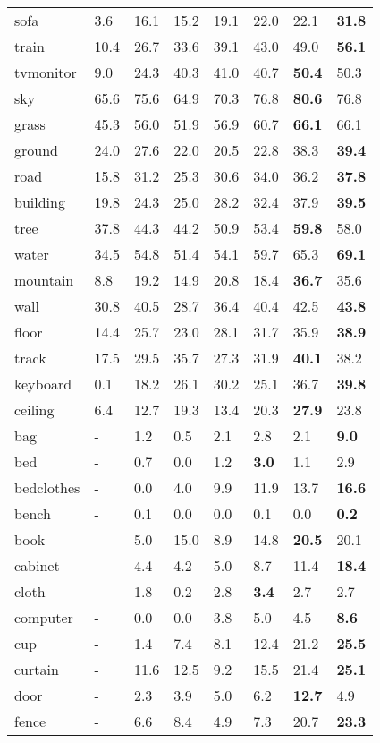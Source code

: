 \documentclass[10pt,twocolumn,letterpaper]{article}
\begin{document}
\begin{table}
\begin{center}
{\begin{tabular}{|x|xx|xxx|x|x|}
	sofa\dag&3.6&16.1&15.2&19.1&{22.0}&22.1&\textbf{31.8}\\
	train\dag&10.4&26.7&33.6&39.1&{43.0}&{49.0}&\textbf{56.1}\\
	tvmonitor\dag&9.0&24.3&40.3&{41.0}&40.7&{\textbf{50.4}}&50.3\\
	sky\dag&65.6&75.6&64.9&70.3&{76.8}&{\textbf{80.6}}&76.8\\
	grass\dag&45.3&56.0&51.9&56.9&{60.7}&{\textbf{66.1}}&66.1\\
	ground\dag&24.0&{27.6}&22.0&20.5&22.8&38.3&\textbf{39.4}\\
	road\dag&15.8&31.2&25.3&30.6&{34.0}&{36.2}&\textbf{37.8}\\
	building\dag&19.8&24.3&25.0&28.2&{32.4}&37.9&\textbf{39.5}\\
	tree\dag&37.8&44.3&44.2&50.9&{53.4}&{\textbf{59.8}}&58.0\\
	water\dag&34.5&54.8&51.4&54.1&{59.7}&65.3&\textbf{69.1}\\
	mountain\dag&8.8&19.2&14.9&{20.8}&18.4&{\textbf{36.7}}&35.6\\
	wall\dag&30.8&{40.5}&28.7&36.4&40.4&{42.5}&\textbf{43.8}\\
	floor\dag&14.4&25.7&23.0&28.1&{31.7}&{35.9}&\textbf{38.9}\\
	track\dag&17.5&29.5&{35.7}&27.3&31.9&{\textbf{40.1}}&38.2\\
	keyboard\dag&0.1&18.2&26.1&{30.2}&25.1&{36.7}&\textbf{39.8}\\
	ceiling\dag&6.4&12.7&19.3&13.4&{20.3}&\textbf{27.9}&23.8\\
	bag&-&1.2&0.5&2.1&2.8&{2.1}&\textbf{9.0}\\
	bed&-&0.7&0.0&1.2&\textbf{3.0}&{1.1}&2.9\\
	bedclothes&-&0.0&4.0&9.9&{11.9}&13.7&\textbf{16.6}\\
	bench&-&0.1&0.0&0.0&0.1&{0.0}&\textbf{0.2}\\
	book&-&5.0&{15.0}&8.9&14.8&{\textbf{20.5}}&20.1\\
	cabinet&-&4.4&4.2&5.0&{8.7}&11.4&\textbf{18.4}\\
	cloth&-&1.8&0.2&2.8&\textbf{3.4}&{2.7}&2.7\\
	computer&-&0.0&0.0&3.8&5.0&{4.5}&\textbf{8.6}\\
	cup&-&1.4&7.4&8.1&{12.4}&21.2&\textbf{25.5}\\
	curtain&-&11.6&12.5&9.2&{15.5}&21.4&\textbf{25.1}\\
	door&-&2.3&3.9&5.0&{6.2}&{\textbf{12.7}}&4.9\\
	fence&-&6.6&{8.4}&4.9&7.3&20.7&\textbf{23.3}\\

\end{tabular}}
\end{center}
\end{table}
\end{document}
